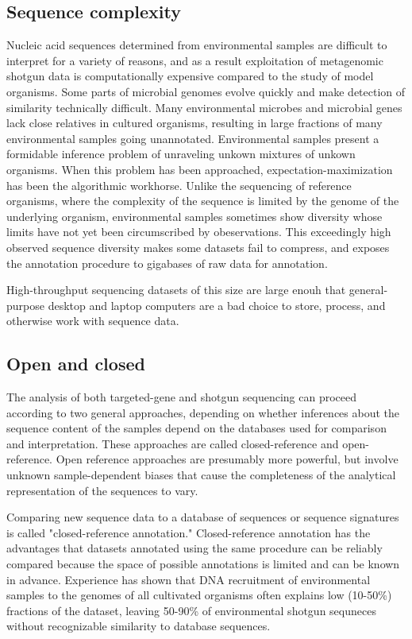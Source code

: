 \documentclass[graybox]{svmult}
\begin{document}
\subsection{Sequence complexity}
Nucleic acid sequences determined from environmental samples are difficult to interpret for a variety of reasons, and as a result exploitation of metagenomic shotgun data is computationally expensive compared to the study of model organisms.
Some parts of microbial genomes evolve quickly and make detection of similarity technically difficult.
Many environmental microbes and microbial genes lack close relatives in cultured organisms, resulting in large fractions of many environmental samples going unannotated.
Environmental samples present a formidable inference problem of unraveling unkown mixtures of unkown organisms.  When this problem has been approached, expectation-maximization has been the algorithmic workhorse.
Unlike the sequencing of reference organisms, where the complexity of the sequence is limited by the genome of the underlying organism, environmental samples sometimes show diversity whose limits have not yet been circumscribed by obeservations.  This exceedingly high observed sequence diversity makes some datasets fail to compress, and exposes the annotation procedure to gigabases of raw data for annotation.

High-throughput sequencing datasets of this size are large enouh that general-purpose desktop and laptop computers are a bad choice to store, process, and otherwise work with sequence data. 

\subsection{Open and closed}
The analysis of both targeted-gene and shotgun sequencing can proceed according to two general approaches, depending on whether inferences about the sequence content of the samples depend on the databases used for comparison and interpretation.  These approaches are called closed-reference and open-reference.  Open reference approaches are presumably more powerful, but involve unknown sample-dependent biases that cause the completeness of the analytical representation of the sequences to vary.

Comparing new sequence data to a database of sequences or sequence signatures is called "closed-reference annotation."  Closed-reference annotation has the advantages that datasets annotated using the same procedure can be reliably compared because the space of possible annotations is limited and can be known in advance.
Experience has shown that DNA recruitment of environmental samples to the genomes of all cultivated organisms often explains low (10-50\%) fractions of the dataset, leaving 50-90\% of environmental shotgun sequneces without recognizable similarity to database sequences.
\end{document}
